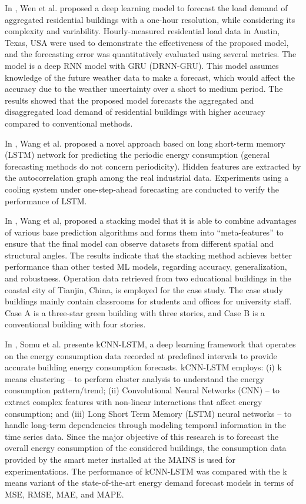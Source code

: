 In \cite{WEN2020106073}, Wen et al. proposed a deep learning model to forecast the load demand of aggregated residential buildings with a one-hour resolution, while considering its complexity and variability.
Hourly-measured residential load data in Austin, Texas, USA were used to demonstrate the effectiveness of the proposed model, and the forecasting error was quantitatively evaluated using several metrics.
The model is a deep RNN model with GRU (DRNN-GRU).
This model assumes knowledge of the future weather data to make a forecast, which would affect the accuracy due to the weather uncertainty over a short to medium period.
The results showed that the proposed model forecasts the aggregated and disaggregated load demand of residential buildings with higher accuracy compared to conventional methods.

In \cite{WANG2020117197}, Wang et al. proposed a novel approach based on long short-term memory (LSTM) network for predicting the periodic energy consumption (general forecasting methods do not concern periodicity).
Hidden features are extracted by the autocorrelation graph among the real industrial data.
Experiments using a cooling system under one-step-ahead forecasting are conducted to verify the performance of LSTM.

In \cite{WANG2020114561}, Wang et al, proposed a stacking model that it is able to combine advantages of various base prediction algorithms and forms them into “meta-features” to ensure that the final model can observe datasets from different spatial and structural angles.
The results indicate that the stacking method achieves better performance than other tested ML models, regarding accuracy, generalization, and robustness.
Operation data retrieved from two educational buildings in the coastal city of Tianjin, China, is employed for the case study. The case study buildings mainly contain classrooms for students and offices for university staff. Case A is a three-star green building with three stories, and Case B is a conventional building with four stories.

In \cite{SOMU2021110591}, Somu et al. presente kCNN-LSTM, a deep learning framework that operates on the energy consumption data recorded at predefined intervals to provide accurate building energy consumption forecasts.
kCNN-LSTM employs:
(i) k means clustering – to perform cluster analysis to understand the energy consumption pattern/trend;
(ii) Convolutional Neural Networks (CNN) – to extract complex features with non-linear interactions that affect energy consumption;
and (iii) Long Short Term Memory (LSTM) neural networks – to handle long-term dependencies through modeling temporal information in the time series data.
Since the major objective of this research is to forecast the overall energy consumption of the considered buildings, the consumption data provided by the smart meter installed at the MAINS is used for experimentations.
The performance of kCNN-LSTM was compared with the k means variant of the state-of-the-art energy demand forecast models in terms of MSE, RMSE, MAE, and MAPE.

